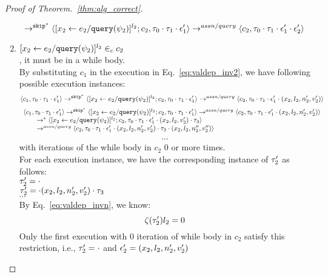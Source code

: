 \begin{proof}[Proof of Theorem.~\ref{thm:alg_correct}]
\begin{case}[$P(\cdot)$]
\begin{subproof}[Subproof]
\begin{enumerate}
\[  \rightarrow^{\mathtt{skip}^*} 
  \langle [\mathrel{ {x}_2 \leftarrow e_2 / {\tt query}(\psi_2) }]^{l_2} ; {c}_2, \mathtt{\tau}_0 \cdot \mathtt{\tau}_1 \cdot \mathtt{\epsilon}_1' \rangle 
  \rightarrow^{assn/query} 
  \langle {c}_2,  \mathtt{\tau}_0 \cdot \mathtt{\tau}_1 \cdot \mathtt{\epsilon}_1' \cdot \mathtt{\epsilon}_2' \rangle 
 \]
%
\item{$[\mathrel{ {x}_2 \leftarrow e_2 / {\tt query}(\psi_2) }]^{l_2} \in_c c_2$}
\\
, it must be in a while body.
\\
 By substituting $c_1$ in the execution in Eq.~\ref{eq:valdep_inv2}, we have following possible execution instances:
  \[
  \langle c_1, \mathtt{\tau}_0 \cdot \mathtt{\tau}_1 \cdot \mathtt{\epsilon}_1' \rangle 
  \rightarrow^{\mathtt{skip}^*} 
  \langle [\mathrel{ {x}_2 \leftarrow e_2 / {\tt query}(\psi_2) }]^{l_2} ; {c}_2, \mathtt{\tau}_0 \cdot \mathtt{\tau}_1 \cdot \mathtt{\epsilon}_1' \rangle 
  \rightarrow^{assn/query} 
  \langle {c}_2,  \mathtt{\tau}_0 \cdot \mathtt{\tau}_1 \cdot \mathtt{\epsilon}_1' \cdot (x_2, l_2, n_2', v_2') \rangle 
 \]
%
  \[
  \begin{array}{l}
  \langle c_1, \mathtt{\tau}_0 \cdot \mathtt{\tau}_1 \cdot \mathtt{\epsilon}_1' \rangle 
  \rightarrow^{\mathtt{skip}^*} 
  \langle [\mathrel{ {x}_2 \leftarrow e_2 / {\tt query}(\psi_2) }]^{l_2} ; {c}_2, \mathtt{\tau}_0 \cdot \mathtt{\tau}_1 \cdot \mathtt{\epsilon}_1' \rangle 
  \rightarrow^{assn/query} 
  \langle {c}_2,  \mathtt{\tau}_0 \cdot \mathtt{\tau}_1 \cdot \mathtt{\epsilon}_1' \cdot (x_2, l_2, n_2', v_2') \rangle 
  \\ \qquad
  \rightarrow^{*} 
  \langle [\mathrel{ {x}_2 \leftarrow e_2 / {\tt query}(\psi_2) }]^{l_2} ; {c}_2, 
  \mathtt{\tau}_0 \cdot \mathtt{\tau}_1 \cdot \mathtt{\epsilon}_1' \cdot (x_2, l_2, v_2') \cdot \mathtt{\tau}_3 \rangle 
  \\ \qquad
  \rightarrow^{assn/query} 
  \langle {c}_2,  \mathtt{\tau}_0 \cdot \mathtt{\tau}_1 \cdot \mathtt{\epsilon}_1' \cdot (x_2, l_2, n_2', v_2') \cdot \mathtt{\tau}_3 \cdot (x_2, l_2, n_2'', v_2'') \rangle 
 \end{array}
 \]
\[
  \cdots
\] 
with iterations of the while body in $c_2$ $0$ or more times.
%
\\
%
For each execution instance, we have the corresponding instance of $\mathtt{\tau}_2'$ as follows:
\\
  $\mathtt{\tau}_2'  = \cdot$
\\
$\mathtt{\tau}_2' = \cdot (x_2, l_2, n_2', v_2') \cdot \mathtt{\tau}_3 $
%
\\
$\cdots$
%
\\
%
By Eq.~\ref{eq:valdep_invn}, we know:
%
\[
 \mathtt{\zeta}(\mathtt{\tau}_2') l_2 = 0
\]
%
Only the first execution with 0 iteration of while body in $c_2$ satisfy this restriction, i.e., $\mathtt{\tau}_2' = \cdot$ and $\mathtt{\epsilon}_2' = (x_2, l_2, n_2', v_2')$
%
\end{enumerate}

\end{subproof}
\end{case}
\end{proof}

